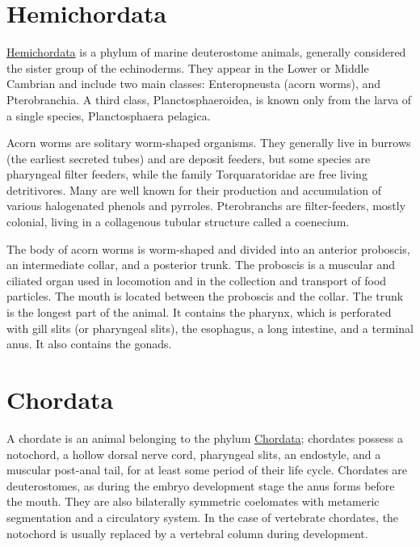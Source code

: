 \section{Hemichordata}\label{hemichordata}

\href{https://en.wikipedia.org/wiki/Hemichordate}{Hemichordata} is a
phylum of marine deuterostome animals, generally considered the sister
group of the echinoderms. They appear in the Lower or Middle Cambrian
and include two main classes: Enteropneusta (acorn worms), and
Pterobranchia. A third class, Planctosphaeroidea, is known only from the
larva of a single species, Planctosphaera pelagica.

Acorn worms are solitary worm-shaped organisms. They generally live in
burrows (the earliest secreted tubes) and are deposit feeders, but some
species are pharyngeal filter feeders, while the family Torquaratoridae
are free living detritivores. Many are well known for their production
and accumulation of various halogenated phenols and pyrroles.
Pterobranchs are filter-feeders, mostly colonial, living in a
collagenous tubular structure called a coenecium.

The body of acorn worms is worm-shaped and divided into an anterior
proboscis, an intermediate collar, and a posterior trunk. The proboscis
is a muscular and ciliated organ used in locomotion and in the
collection and transport of food particles. The mouth is located between
the proboscis and the collar. The trunk is the longest part of the
animal. It contains the pharynx, which is perforated with gill slits (or
pharyngeal slits), the esophagus, a long intestine, and a terminal anus.
It also contains the gonads.

\section{Chordata}\label{chordata}

A chordate is an animal belonging to the phylum
\href{https://en.wikipedia.org/wiki/Chordate}{Chordata}; chordates
possess a notochord, a hollow dorsal nerve cord, pharyngeal slits, an
endostyle, and a muscular post-anal tail, for at least some period of
their life cycle. Chordates are deuterostomes, as during the embryo
development stage the anus forms before the mouth. They are also
bilaterally symmetric coelomates with metameric segmentation and a
circulatory system. In the case of vertebrate chordates, the notochord
is usually replaced by a vertebral column during development.

